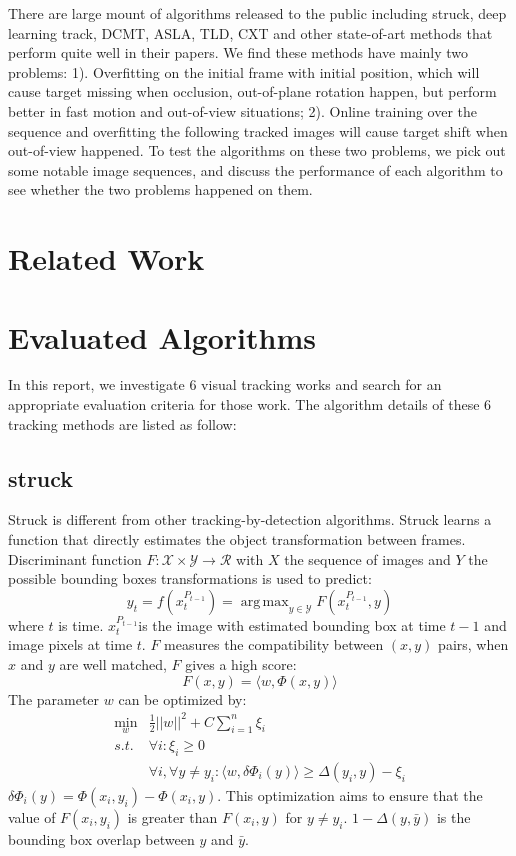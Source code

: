\documentclass{acm_proc_article-sp}
\DeclareMathOperator*{\argmax}{arg\,max}
\DeclareMathOperator*{\minbelow}{min}
\begin{document}
There are large mount of algorithms released to the public including struck\cite{struck}, deep learning track\cite{dlt}, DCMT\cite{dcmt}, ASLA\cite{asla}, TLD\cite{tld}, CXT\cite{cxt} and other state-of-art methods that perform quite well in their papers. 
We find these methods have mainly two problems: 
1). Overfitting on the initial frame with initial position, which will cause target missing when occlusion, out-of-plane rotation happen, but perform better in fast motion and out-of-view situations;
2). Online training over the sequence and overfitting the following tracked images will cause target shift when out-of-view happened.
To test the algorithms on these two problems, we pick out some notable image sequences, and discuss the performance of each algorithm to see whether the two problems happened on them.

\section{Related Work}


\section{Evaluated Algorithms}
In this report, we investigate 6 visual tracking works and search for an appropriate evaluation criteria for those work. The algorithm details of these 6 tracking methods are listed as follow:

\subsection{struck}
Struck\cite{struck} is different from other tracking-by-detection algorithms. Struck learns a function that directly estimates the object transformation between frames. Discriminant function $F:\mathcal{X} \times \mathcal{Y} \to \mathcal{R}$ with $X$ the sequence of images and $Y$ the possible bounding boxes transformations is used to predict:
\[
y_t = f(x_t^{P_{t-1}}) = \argmax_{y\in \mathcal{Y}}F(x_t^{P_{t-1}},y)
\]
where $t$ is time. $x_t^{P_{t-1}}$is the image with estimated bounding box at time $t-1$ and image pixels at time $t$. $F$ measures the compatibility between $(x,y)$ pairs, when $x$ and $y$ are well matched, $F$ gives a high score:
\[
F(x,y)=\langle w, \Phi(x,y) \rangle
\]
The parameter $w$ can be optimized by:
\begin{align}
\minbelow_w	&\frac{1}{2}||w||^2 + C \sum_{i=1}^n\xi_i\nonumber\\
	s.t.	&\forall i: \xi_i \ge 0\nonumber\\
			&\forall i, \forall y\not= y_i : \langle w, \delta\Phi_i(y)\rangle \ge \Delta(y_i,y)-\xi_i
\end{align}
$\delta\Phi_i(y)=\Phi(x_i, y_i) - \Phi(x_i, y)$. This optimization aims to ensure that the value of $F(x_i, y_i)$ is greater than $F(x_i, y)$ for $y\not= y_i$. $1-\Delta(y,\bar{y})$ is the bounding box overlap between $y$ and $\bar{y}$.
\end{document}
